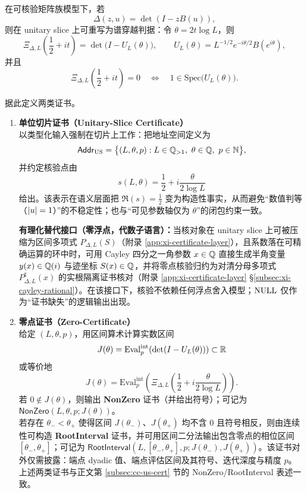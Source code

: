 在可核验矩阵族模型下，若
$$
\Delta(z,u)=\det(I-zB(u)),
$$
则在 unitary slice 上可重写为谱穿越判据：令 $\theta=2t\log L$，则
$$
\Xi_{\Delta,L}\!\left(\frac12+it\right)=\det\!\bigl(I-U_L(\theta)\bigr),
\qquad
U_L(\theta)=L^{-1/2}e^{-i\theta/2}B(e^{i\theta}),
$$
并且
$$
\Xi_{\Delta,L}\!\left(\frac12+it\right)=0\quad\Longleftrightarrow\quad 1\in\mathrm{Spec}\bigl(U_L(\theta)\bigr).
$$

据此定义两类证书。
\begin{enumerate}
  \item \textbf{单位切片证书（Unitary-Slice Certificate）}\\
  以类型化输入强制在切片上工作：把地址空间定义为
  $$
  \Addr_{\mathrm{US}}=\bigl\{(L,\theta,p):L\in\QQ_{>1},\ \theta\in\QQ,\ p\in\NN\bigr\},
  $$
  并约定核验点由
  $$
  s(L,\theta)=\frac12+i\frac{\theta}{2\log L}
  $$
  给出。该表示在语义层面把 $\Re(s)=\frac12$ 变为构造性事实，从而避免“数值判等（$\left\lvert u\right\rvert=1$）”的不稳定性；也与“可见参数轴仅为 $\theta$”的闭包约束一致。
  \par
  \textbf{有理化替代接口（零浮点，代数子语言）：}当核对象在 unitary slice 上可被压缩为区间多项式 $P_{\Delta,L}(S)$（附录 \ref{app:xi-certificate-layer}），且系数落在可精确运算的环中时，可用 Cayley 四分之一角参数 $x\in\mathbb{Q}$ 直接生成半角变量 $y(x)\in\mathbb{Q}(i)$ 与迹坐标 $S(x)\in\mathbb{Q}$，并将零点核验归约为对清分母多项式 $P_{\Delta,L}^\sharp(x)$ 的实根隔离证书核对（附录 \ref{app:xi-certificate-layer} \S\ref{subsec:xi-cayley-rational}）。在该接口下，核验不依赖任何浮点舍入模型；$\mathrm{NULL}$ 仅作为“证书缺失”的逻辑输出出现。

  \item \textbf{零点证书（Zero-Certificate）}\\
  给定 $(L,\theta,p)$，用区间算术计算实数区间
  $$
  J(\theta)=\mathrm{Eval}^{\mathrm{int}}_{p}\!\left(\det(I-U_L(\theta))\right)\subset\mathbb{R}
  $$
  或等价地
  $$
  J(\theta)=\mathrm{Eval}^{\mathrm{int}}_{p}\!\left(\Xi_{\Delta,L}\!\left(\frac12+i\frac{\theta}{2\log L}\right)\right).
  $$
  若 $0\notin J(\theta)$，则输出 \textbf{NonZero} 证书（并给出符号）；可记为
  $
  \mathsf{NonZero}(L,\theta,p;J(\theta))
  $。\\
  若存在 $\theta_-<\theta_+$ 使得区间 $J(\theta_-)$、$J(\theta_+)$ 均不含 $0$ 且符号相反，则由连续性可构造 \textbf{RootInterval} 证书，并可用区间二分法输出包含零点的相位区间 $[\theta_-,\theta_+]$；可记为
  $
  \mathsf{RootInterval}(L,[\theta_-,\theta_+],p;J(\theta_-),J(\theta_+))
  $。该证书对外仅需披露：端点 dyadic 值、端点评估区间及其符号、迭代深度与精度 $p$。上述两类证书与正文第 \ref{subsec:cc-us-cert} 节的 NonZero/RootInterval 表述一致。
\end{enumerate}


